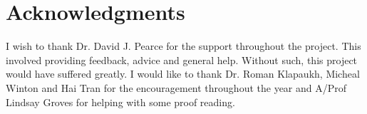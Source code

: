 \chapter*{Acknowledgments}\label{C:ack} 
I wish to thank Dr. David J. Pearce for the support throughout the project. This involved providing feedback, advice and general help. Without such, this project would have suffered greatly. I would like to thank Dr. Roman Klapaukh, Micheal Winton and Hai Tran for the encouragement throughout the year and A/Prof Lindsay Groves for helping with some proof reading.